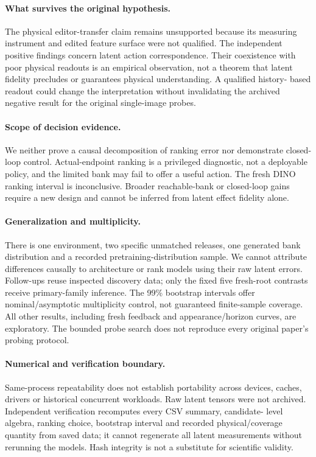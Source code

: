 \paragraph{What survives the original hypothesis.}
The physical editor-transfer claim remains unsupported because its measuring
instrument and edited feature surface were not qualified. The independent
positive findings concern latent action correspondence. Their coexistence with
poor physical readouts is an empirical observation, not a theorem that latent
fidelity precludes or guarantees physical understanding. A qualified history-
based readout could change the interpretation without invalidating the archived
negative result for the original single-image probes.

\paragraph{Scope of decision evidence.}
We neither prove a causal decomposition of ranking error nor demonstrate
closed-loop control. Actual-endpoint ranking is a privileged diagnostic, not a
deployable policy, and the limited bank may fail to offer a useful action.
The fresh DINO ranking interval is inconclusive. Broader reachable-bank or
closed-loop gains require a new design and cannot be inferred from latent
effect fidelity alone.

\paragraph{Generalization and multiplicity.}
There is one environment, two specific unmatched releases, one generated bank
distribution and a recorded pretraining-distribution sample. We cannot attribute
differences causally to architecture or rank models using their raw latent
errors. Follow-ups reuse inspected discovery data; only the fixed five fresh-root
contrasts receive primary-family inference. The 99\% bootstrap intervals offer
nominal/asymptotic multiplicity control, not guaranteed finite-sample coverage.
All other results, including fresh feedback and appearance/horizon curves, are
exploratory. The bounded probe search does not reproduce every original paper's
probing protocol.

\paragraph{Numerical and verification boundary.}
Same-process repeatability does not establish portability across devices,
caches, drivers or historical concurrent workloads. Raw latent tensors were not
archived. Independent verification recomputes every CSV summary, candidate-
level algebra, ranking choice, bootstrap interval and recorded physical/coverage
quantity from saved data; it cannot regenerate all latent measurements without
rerunning the models. Hash integrity is not a substitute for scientific validity.

